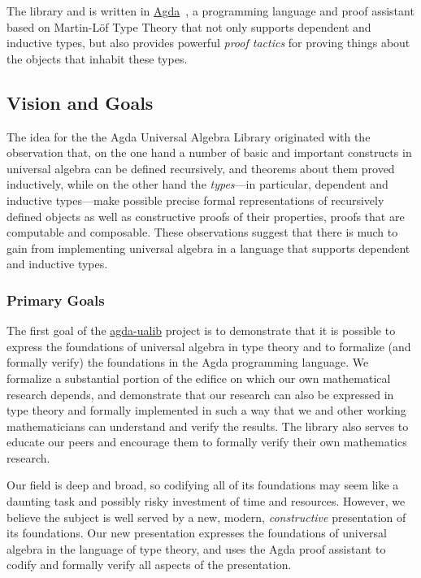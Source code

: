 \documentclass[sigplan,screen]{acmart}
\begin{document}
The library and is written in \href{https://wiki.portal.chalmers.se/agda/pmwiki.php}{Agda}~\cite{Norell:2009}, a programming language and proof assistant based on Martin-L\"of Type Theory that not only supports dependent and inductive types, but also provides powerful \emph{proof tactics} for proving things about the objects that inhabit these types.

\subsection{Vision and Goals}\label{vision-and-goals}
The idea for the the Agda Universal Algebra Library originated with the observation that, on the one hand a number of basic and important constructs in universal algebra can be defined recursively, and theorems about them proved inductively, while on the other hand the \emph{types}---in particular, dependent and inductive types---make possible precise formal representations of recursively defined objects as well as constructive proofs of their properties, proofs that are computable and composable. These observations suggest that there is much to gain from implementing universal algebra in a language that supports dependent and inductive types.

\subsubsection{Primary Goals}\label{primary-goals}
The first goal of the \href{https://ualib.org}{agda-ualib} project is to demonstrate that it is possible to express the foundations of universal algebra in type theory and to formalize (and formally verify) the foundations in the
Agda programming language. We formalize a substantial portion of the edifice on which our own mathematical research depends, and demonstrate that our research can also be expressed in type theory and formally implemented in such a way that we and other working mathematicians can understand and verify the results. The library also serves to educate our peers and encourage them to formally verify their own mathematics research.

Our field is deep and broad, so codifying all of its foundations may seem like a daunting task and possibly risky investment of time and resources. However, we believe the subject is well served by a new, modern, \emph{constructive} presentation of its foundations. Our new presentation expresses the foundations of universal algebra in the language of type theory, and uses the Agda proof assistant to codify and formally verify all aspects of the presentation.
\end{document}

